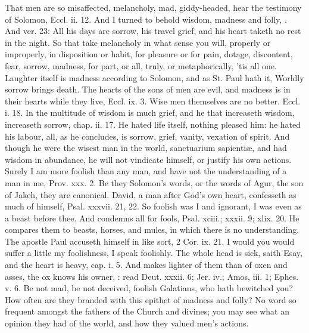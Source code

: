 {That men are so misaffected, melancholy, mad, giddy-headed, hear the
testimony of Solomon, Eccl. ii. 12. And I turned to behold wisdom,
madness and folly, \etc. And ver. 23: All his days are sorrow, his travel
grief, and his heart taketh no rest in the night. So that take
melancholy in what sense you will, properly or improperly, in
disposition or habit, for pleasure or for pain, dotage, discontent,
fear, sorrow, madness, for part, or all, truly, or metaphorically, 'tis
all one. Laughter itself is madness according to Solomon, and as St.
Paul hath it, Worldly sorrow brings death. The hearts of the sons of
men are evil, and madness is in their hearts while they live, Eccl. ix.
3. Wise men themselves are no better. Eccl. i. 18. In the multitude of
wisdom is much grief, and he that increaseth wisdom, increaseth sorrow,
chap. ii. 17. He hated life itself, nothing pleased him: he hated his
labour, all, as he concludes, is sorrow, grief, vanity, vexation
of spirit. And though he were the wisest man in the world, sanctuarium
sapienti\ae{}, and had wisdom in abundance, he will not vindicate himself,
or justify his own actions. Surely I am more foolish than any man, and
have not the understanding of a man in me, Prov. xxx. 2. Be they
Solomon's words, or the words of Agur, the son of Jakeh, they are
canonical. David, a man after God's own heart, confesseth as much of
himself, Psal. xxxvii. 21, 22. So foolish was I and ignorant, I was
even as a beast before thee. And condemns all for fools, Psal. xciii.;
xxxii. 9; xlix. 20. He compares them to beasts, horses, and mules, in
which there is no understanding. The apostle Paul accuseth himself in
like sort, 2 Cor. ix. 21. I would you would suffer a little my
foolishness, I speak foolishly. The whole head is sick, saith Esay, and
the heart is heavy, cap. i. 5. And makes lighter of them than of oxen
and asses, the ox knows his owner, \etc: read Deut. xxxii. 6; Jer. iv.;
Amos, iii. 1; Ephes. v. 6. Be not mad, be not deceived, foolish
Galatians, who hath bewitched you? How often are they branded with this
epithet of madness and folly? No word so frequent amongst the fathers
of the Church and divines; you may see what an opinion they had of the
world, and how they valued men's actions.

}
